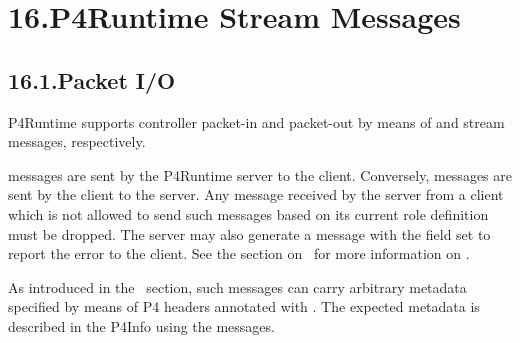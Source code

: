 \documentclass[11pt]{article}
\begin{document}
{%
\section{16.\hspace*{0.5em}P4Runtime Stream Messages}\label{sec-p4runtime-stream-messages}%

\subsection{16.1.\hspace*{0.5em}Packet I/O}\label{sec-packet-i_o}%

\noindent{}P4Runtime supports controller packet-in and packet-out by means of 
and  stream messages, respectively.%

 messages are sent by the P4Runtime server to the client. Conversely,
 messages are sent by the client to the server. Any 
message received by the server from a client which is not allowed to send such
messages based on its current role definition must be dropped. The server may
also generate a  message with the  field set to
report the error to the client. See the section on~ for more information on .%

As introduced in the~
section, such messages can carry arbitrary metadata specified by means of P4
headers annotated with . The expected metadata is described
in the P4Info using the  messages.%

}
\end{document}

